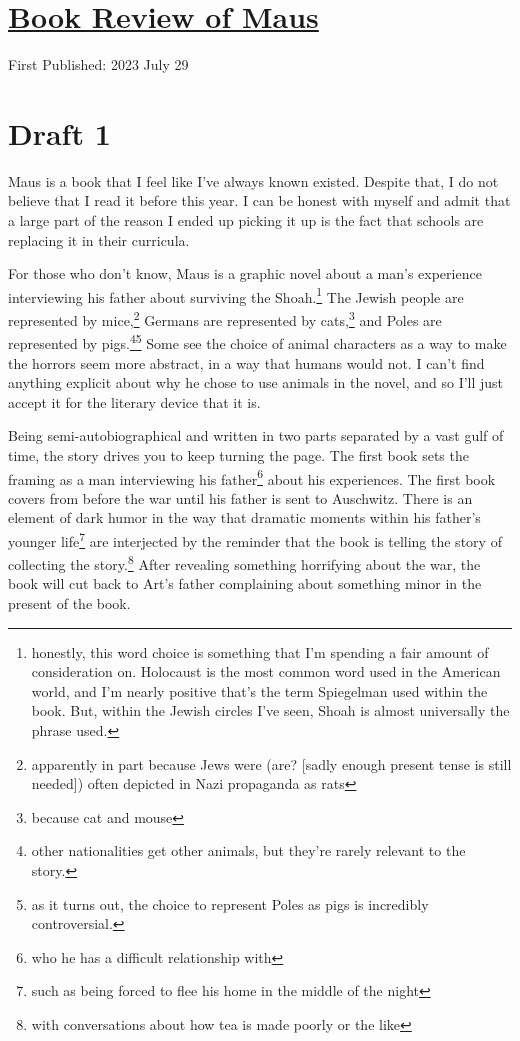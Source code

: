 \documentclass[12pt]{article}[titlepage]
\newcommand{\1}{\={a}}
\newcommand{\2}{\={e}}
\newcommand{\3}{\={\i}}
\newcommand{\4}{\=o}
\newcommand{\5}{\=u}
\newcommand{\6}{\={A}}
\renewcommand{\,}{\textsuperscript{,}}
\begin{document}
\doublespacing
\section{\href{book-review-maus.html}{Book Review of Maus}}
First Published: 2023 July 29
\section{Draft 1}
Maus is a book that I feel like I've always known existed.
Despite that, I do not believe that I read it before this year.
I can be honest with myself and admit that a large part of the reason I ended up picking it up is the fact that schools are replacing it in their curricula.

For those who don't know, Maus is a graphic novel about a man's experience interviewing his father about surviving the Shoah.\footnote{honestly, this word choice is something that I'm spending a fair amount of consideration on. Holocaust is the most common word used in the American world, and I'm nearly positive that's the term Spiegelman used within the book.
But, within the Jewish circles I've seen, Shoah is almost universally the phrase used.}
The Jewish people are represented by mice,\footnote{apparently in part because Jews were (are? [sadly enough present tense is still needed]) often depicted in Nazi propaganda as rats} Germans are represented by cats,\footnote{because cat and mouse} and Poles are represented by pigs.\footnote{other nationalities get other animals, but they're rarely relevant to the story.}\footnote{as it turns out, the choice to represent Poles as pigs is incredibly controversial.}
Some see the choice of animal characters as a way to make the horrors seem more abstract, in a way that humans would not.
I can't find anything explicit about why he chose to use animals in the novel, and so I'll just accept it for the literary device that it is.

Being semi-autobiographical and written in two parts separated by a vast gulf of time, the story drives you to keep turning the page.
The first book sets the framing as a man interviewing his father\footnote{who he has a difficult relationship with} about his experiences.
The first book covers from before the war until his father is sent to Auschwitz.
There is an element of dark humor in the way that dramatic moments within his father's younger life\footnote{such as being forced to flee his home in the middle of the night} are interjected by the reminder that the book is telling the story of collecting the story.\footnote{with conversations about how tea is made poorly or the like}
After revealing something horrifying about the war, the book will cut back to Art's father complaining about something minor in the present of the book.
\end{document}
